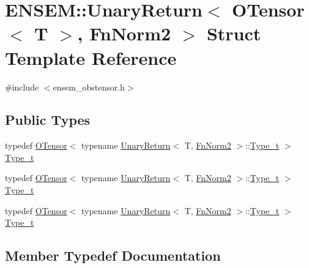 \hypertarget{structENSEM_1_1UnaryReturn_3_01OTensor_3_01T_01_4_00_01FnNorm2_01_4}{}\section{E\+N\+S\+EM\+:\+:Unary\+Return$<$ O\+Tensor$<$ T $>$, Fn\+Norm2 $>$ Struct Template Reference}
\label{structENSEM_1_1UnaryReturn_3_01OTensor_3_01T_01_4_00_01FnNorm2_01_4}


{\ttfamily \#include $<$ensem\+\_\+obstensor.\+h$>$}

\subsection*{Public Types}
\begin{DoxyCompactItemize}
\item 
typedef \mbox{\hyperlink{classENSEM_1_1OTensor}{O\+Tensor}}$<$ typename \mbox{\hyperlink{structENSEM_1_1UnaryReturn}{Unary\+Return}}$<$ T, \mbox{\hyperlink{structENSEM_1_1FnNorm2}{Fn\+Norm2}} $>$\+::\mbox{\hyperlink{structENSEM_1_1UnaryReturn_3_01OTensor_3_01T_01_4_00_01FnNorm2_01_4_a61af55ec610c7d6312c97907937f00bd}{Type\+\_\+t}} $>$ \mbox{\hyperlink{structENSEM_1_1UnaryReturn_3_01OTensor_3_01T_01_4_00_01FnNorm2_01_4_a61af55ec610c7d6312c97907937f00bd}{Type\+\_\+t}}
\item 
typedef \mbox{\hyperlink{classENSEM_1_1OTensor}{O\+Tensor}}$<$ typename \mbox{\hyperlink{structENSEM_1_1UnaryReturn}{Unary\+Return}}$<$ T, \mbox{\hyperlink{structENSEM_1_1FnNorm2}{Fn\+Norm2}} $>$\+::\mbox{\hyperlink{structENSEM_1_1UnaryReturn_3_01OTensor_3_01T_01_4_00_01FnNorm2_01_4_a61af55ec610c7d6312c97907937f00bd}{Type\+\_\+t}} $>$ \mbox{\hyperlink{structENSEM_1_1UnaryReturn_3_01OTensor_3_01T_01_4_00_01FnNorm2_01_4_a61af55ec610c7d6312c97907937f00bd}{Type\+\_\+t}}
\item 
typedef \mbox{\hyperlink{classENSEM_1_1OTensor}{O\+Tensor}}$<$ typename \mbox{\hyperlink{structENSEM_1_1UnaryReturn}{Unary\+Return}}$<$ T, \mbox{\hyperlink{structENSEM_1_1FnNorm2}{Fn\+Norm2}} $>$\+::\mbox{\hyperlink{structENSEM_1_1UnaryReturn_3_01OTensor_3_01T_01_4_00_01FnNorm2_01_4_a61af55ec610c7d6312c97907937f00bd}{Type\+\_\+t}} $>$ \mbox{\hyperlink{structENSEM_1_1UnaryReturn_3_01OTensor_3_01T_01_4_00_01FnNorm2_01_4_a61af55ec610c7d6312c97907937f00bd}{Type\+\_\+t}}
\end{DoxyCompactItemize}


\subsection{Member Typedef Documentation}
\mbox{\label{structENSEM_1_1UnaryReturn_3_01OTensor_3_01T_01_4_00_01FnNorm2_01_4_a61af55ec610c7d6312c97907937f00bd}} 
